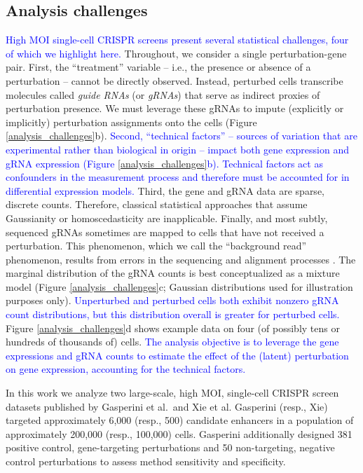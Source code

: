 \documentclass[12pt]{article}
\newcommand{\blue}[1]{\textcolor{blue}{#1}}
\begin{document}
\subsection{Analysis challenges}
\blue{High MOI single-cell CRISPR screens present several statistical challenges, four of which we highlight here.} Throughout, we consider a single perturbation-gene pair. First, the ``treatment'' variable -- i.e., the presence or absence of a perturbation -- cannot be directly observed. Instead, perturbed cells transcribe molecules called  \textit{guide RNAs} (or \textit{gRNAs}) that serve as indirect proxies of perturbation presence. We must leverage these gRNAs to impute (explicitly or implicitly) perturbation assignments onto the cells (Figure \ref{analysis_challenges}b). \blue{Second, ``technical factors'' -- sources of variation that are experimental rather than biological in origin -- impact both gene expression and gRNA expression (Figure \ref{analysis_challenges}b). Technical factors act as confounders in the measurement process and therefore must be accounted for in differential expression models.} Third, the gene and gRNA data are sparse, discrete counts. Therefore, classical statistical approaches that assume Gaussianity or homoscedasticity are inapplicable. Finally, and most subtly, sequenced gRNAs sometimes are mapped to cells that have not received a perturbation. This phenomenon, which we call the ``background read'' phenomenon, results from errors in the sequencing and alignment processes \cite{Replogle2020}. The marginal distribution of the gRNA counts is best conceptualized as a mixture model (Figure \ref{analysis_challenges}c; Gaussian distributions used for illustration purposes only). \blue{Unperturbed and perturbed cells both exhibit nonzero gRNA count distributions, but this distribution overall is greater for perturbed cells.} Figure \ref{analysis_challenges}d shows example data on four (of possibly tens or hundreds of thousands of) cells. \blue{The analysis objective is to leverage the gene expressions and gRNA counts to estimate the effect of the (latent) perturbation on gene expression, accounting for the technical factors.}

In this work we analyze two large-scale, high MOI, single-cell CRISPR screen datasets published by Gasperini et al.\ and Xie et al. Gasperini (resp., Xie) targeted approximately 6,000 (resp., 500) candidate enhancers in a population of approximately 200,000 (resp., 100,000) cells. Gasperini additionally designed 381 positive control, gene-targeting perturbations and 50 non-targeting, negative control perturbations to assess method sensitivity and specificity.
\end{document}
